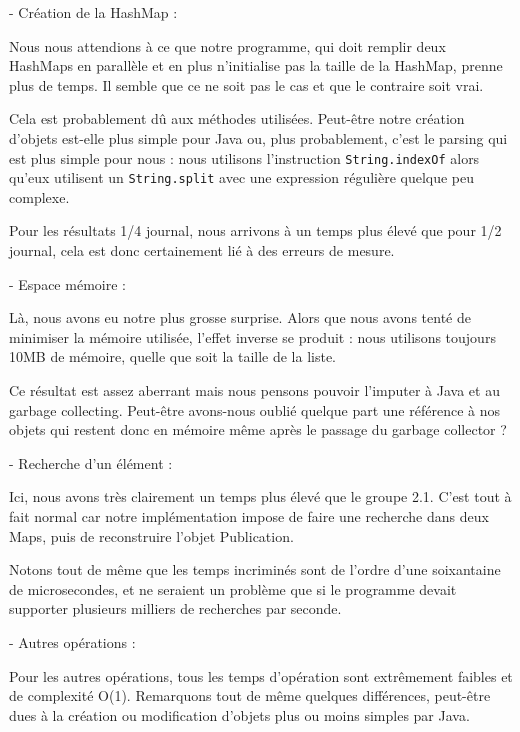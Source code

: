 \documentclass[a4paper,10pt]{article}
\begin{document}
	- Création de la HashMap :
	
	Nous nous attendions à ce que notre programme, qui doit remplir deux HashMaps en parallèle et en plus n'initialise pas la taille de la HashMap, prenne plus de temps. Il semble que ce ne soit pas le cas et que le contraire soit vrai.
	
	Cela est probablement dû aux méthodes utilisées. Peut-être notre création d'objets est-elle plus simple pour Java ou, plus probablement, c'est le parsing qui est plus simple pour nous : nous utilisons l'instruction \texttt{String.indexOf} alors qu'eux utilisent un \texttt{String.split} avec une expression régulière quelque peu complexe.
	
	Pour les résultats 1/4 journal, nous arrivons à un temps plus élevé que pour 1/2 journal, cela est donc certainement lié à des erreurs de mesure.
	
	\vspace{0.4cm}
	- Espace mémoire :
	
	Là, nous avons eu notre plus grosse surprise. Alors que nous avons tenté de minimiser la mémoire utilisée, l'effet inverse se produit : nous utilisons toujours 10MB de mémoire, quelle que soit la taille de la liste.
	
	Ce résultat est assez aberrant mais nous pensons pouvoir l'imputer à Java et au garbage collecting. Peut-être avons-nous oublié quelque part une référence à nos objets qui restent donc en mémoire même après le passage du garbage collector ?
	
	\vspace{0.4cm}
	- Recherche d'un élément :
	
	Ici, nous avons très clairement un temps plus élevé que le groupe 2.1. C'est tout à fait normal car notre implémentation impose de faire une recherche dans deux Maps, puis de reconstruire l'objet Publication.
	
	Notons tout de même que les temps incriminés sont de l'ordre d'une soixantaine de microsecondes, et ne seraient un problème que si le programme devait supporter plusieurs milliers de recherches par seconde.

	\vspace{0.4cm}
	- Autres opérations :
	
	Pour les autres opérations, tous les temps d'opération sont extrêmement faibles et de complexité O(1). Remarquons tout de même quelques différences, peut-être dues à la création ou modification d'objets plus ou moins simples par Java.
\end{document}
